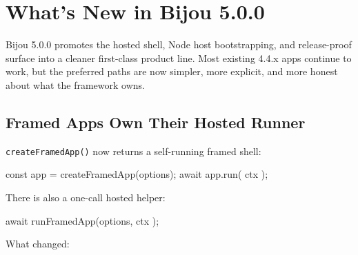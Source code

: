 \chapter{What's New in Bijou 5.0.0}\label{record-280}

\smallskip

Bijou 5.0.0 promotes the hosted shell, Node host bootstrapping, and release-proof surface into a cleaner first-class product line. Most existing 4.4.x apps continue to work, but the preferred paths are now simpler, more explicit, and more honest about what the framework owns.

\section{Framed Apps Own Their Hosted Runner}\label{record-280-framed-apps-own-their-hosted-runner}

\texttt{c\allowbreak{}r\allowbreak{}e\allowbreak{}a\allowbreak{}t\allowbreak{}e\allowbreak{}F\allowbreak{}r\allowbreak{}a\allowbreak{}m\allowbreak{}e\allowbreak{}d\allowbreak{}A\allowbreak{}p\allowbreak{}p\allowbreak{}(\allowbreak{})} now returns a self-running framed shell:

\begin{CodeBlock}
const app = createFramedApp(options);
await app.run({ ctx });
\end{CodeBlock}

There is also a one-call hosted helper:

\begin{CodeBlock}
await runFramedApp(options, { ctx });
\end{CodeBlock}

What changed:

